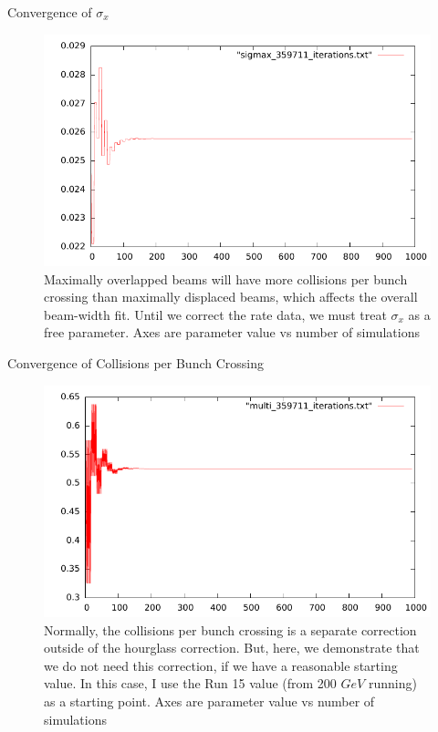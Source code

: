 \begin{frame}{Convergence of $\sigma_{x}$ }
\begin{figure}
\begin{center}
\includegraphics[width=0.8\linewidth]{../RootFinding/figs/sigmax_359711_convergence.pdf}
\end{center}
\caption{ 
Maximally overlapped beams will have more collisions per bunch crossing than
maximally displaced beams, which affects the overall beam-width fit. Until we
correct the rate data, we must treat $\sigma_{x}$ as a free parameter. Axes are
parameter value vs number of
simulations}
\label{fig:sigmax_359711_convergence}
\end{figure}
\end{frame}

\begin{frame}{Convergence of Collisions per Bunch Crossing}
\begin{figure}
\begin{center}
\includegraphics[width=0.8\linewidth]{../RootFinding/figs/multi_359711_convergence.pdf}
\end{center}
\caption{Normally, the collisions per bunch crossing is a separate correction
outside of the hourglass correction. But, here, we demonstrate that we do not
need this correction, if we have a reasonable starting value. In this case, I
use the Run 15 value (from 200 $GeV$ running) as a starting point. Axes are
parameter value vs number of simulations}
\label{fig:multi_359711_convergence}
\end{figure}
\end{frame}

